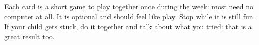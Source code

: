 \documentclass[track=junior,level=1]{kidscode}
\begin{document}

\begin{grownup}
Each card is a short game to play together once during the week: most need no computer at all.
It is optional and should feel like play. Stop while it is still fun. If your child gets stuck,
do it together and talk about what you tried: that is a great result too.
\end{grownup}
\kcweeklytoc
{}
\end{document}
